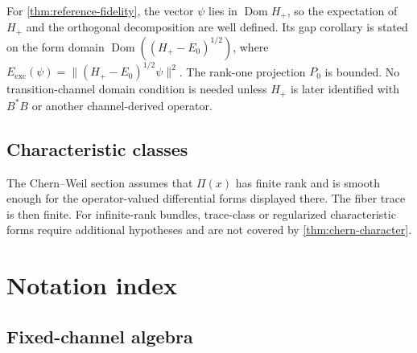 \documentclass[11pt,reqno]{scrartcl}
\DeclareMathOperator{\Dom}{Dom}
\theoremstyle{plain}
\theoremstyle{definition}
\theoremstyle{remark}
\begin{document}
For \cref{thm:reference-fidelity}, the vector \(\psi\) lies in
\(\Dom H_+\), so the expectation of \(H_+\) and the orthogonal decomposition
are well defined.  Its gap corollary is stated on the form domain
\(\Dom((H_+-E_0)^{1/2})\), where
\(E_{\mathrm{exc}}(\psi)=\|(H_+-E_0)^{1/2}\psi\|^2\).  The rank-one projection \(P_0\) is bounded.
No transition-channel domain condition is needed unless \(H_+\) is later
identified with \(B^*B\) or another channel-derived operator.

\subsection{Characteristic classes}

The Chern--Weil section assumes that \(\Pi(x)\) has finite rank and is smooth
enough for the operator-valued differential forms displayed there.  The
fiber trace is then finite.  For infinite-rank bundles, trace-class or
regularized characteristic forms require additional hypotheses and are not
covered by \cref{thm:chern-character}.

\clearpage

\section{Notation index}
\label{app:notation}

\subsection{Fixed-channel algebra}
\end{document}
